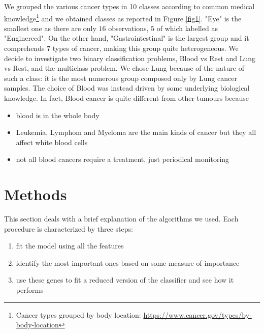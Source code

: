 \documentclass[a4paper,11pt, oneside]{article}  %
\begin{document}
We  grouped the various cancer types in 10 classes according to common medical knowledge\footnote{Cancer types grouped by body location: \url{https://www.cancer.gov/types/by-body-location}} and we obtained classes as reported in Figure \ref{fig1}.  "Eye" is the smallest one as there are only $16$ observations, $5$ of which labelled as "Enginereed". On the other hand, "Gastrointestinal" is the largest group and it comprehends $7$ types of cancer,  making this group quite heterogeneous.
We decide to investigate two binary classification problems,  Blood vs Rest and Lung vs Rest, and the multiclass problem. We chose Lung because of the nature of such a class: it is the most numerous group composed only by Lung cancer samples. The choice of Blood was instead driven by some underlying biological knowledge. In fact,  Blood cancer is quite different from other tumours because
\begin{itemize}
	\item blood is in the whole body
	\item Leukemia, Lymphom and Myeloma are the main kinds of cancer but they all affect white blood cells
	\item not all blood cancers require a treatment, just periodical monitoring
\end{itemize} 


\section{Methods}
This section deals with a brief explanation of the algorithms we used.  Each procedure is characterized by three steps:
\begin{enumerate}
\item fit the model using all the features
\item identify the most important ones based on some measure of importance
\item use these genes to fit a reduced version of the classifier and see how it performs
\end{enumerate}
\end{document}
